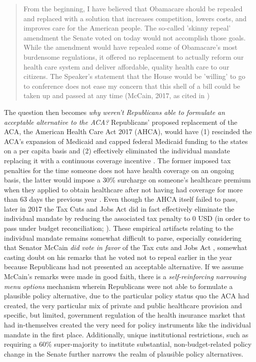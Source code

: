 \documentclass[11pt]{article}
\begin{document}
\begin{quote}
  From the beginning, I have believed that Obamacare should be repealed and replaced with a solution that increases competition, lowers costs, and improves care for the American people. The so-called 'skinny repeal' amendment the Senate voted on today would not accomplish those goals. While the amendment would have repealed some of Obamacare's most burdensome regulations, it offered no replacement to actually reform our health care system and deliver affordable, quality health care to our citizens. The Speaker's statement that the House would be 'willing' to go to conference does not ease my concern that this shell of a bill could be taken up and passed at any time (McCain, 2017, as cited in )
\end{quote}

The question then becomes \textit{why weren't Republicans able to formulate an acceptable alternative to the ACA?} Republicans' proposed replacement of the ACA, the American Health Care Act 2017 (AHCA), would have (1) rescinded the ACA's expansion of Medicaid and capped federal Medicaid funding to the states on a per capita basis  and (2) effectively eliminated the individual mandate replacing it with a continuous coverage incentive \parencite[][]{Jost2017a}. The former imposed tax penalties for the time someone does not have health coverage on an ongoing basis, the latter would impose a 30\% surcharge on someone's healthcare premium when they applied to obtain healthcare after not having had coverage for more than 63 days the previous year \parencite[][]{Spitalnic2017}. Even though the AHCA itself failed to pass, later in 2017 the Tax Cuts and Jobs Act did in fact effectively eliminate the individual mandate by reducing the associated tax penalty to 0 USD (in order to pass under budget reconciliation; ). These empirical artifacts relating to the individual mandate remains somewhat difficult to parse, especially considering that Senator McCain \textit{did vote in favor} of the Tax cuts and Jobs Act \parencite[][]{SenateND}, somewhat casting doubt on his remarks that he voted not to repeal earlier in the year because Republicans had not presented an acceptable alternative. If we assume McCain's remarks were made in good faith, there is a \textit{self-reinforcing narrowing menu options} mechanism wherein Republicans were not able to formulate a plausible policy alternative, due to the particular policy status quo the ACA had created, the very particular mix of private and public healthcare provision and specific, but limited, government regulation of the health insurance market that had in-themselves created the very need for policy instruments like the individual mandate in the first place. Additionally, unique institutional restrictions, such as requiring a 60\% super-majority to institute substantial, non-budget-related policy change in the Senate further narrows the realm of plausible policy alternatives.
\end{document}

